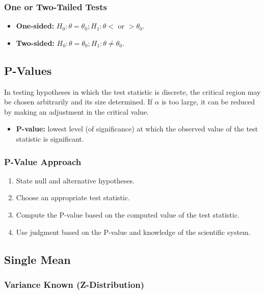 \documentclass[10pt, letterpaper, twoside]{article}
\begin{document}
\begin{multicols}{2}
\subsubsection{One or Two-Tailed Tests}
\begin{itemize}
    \item \textbf{One-sided:} $H_0: \theta = \theta_0; H_1: \theta <$ or $> \theta_0$.
    \item \textbf{Two-sided:} $H_0: \theta = \theta_0; H_1: \theta \neq \theta_0$.
\end{itemize}

\subsection{P-Values}

In testing hypotheses in which the test statistic is discrete, the critical region may be chosen arbitrarily and its size determined. If $\alpha$ is too large, it can be reduced by making an adjustment in the critical value.
\begin{itemize}
    \item \textbf{P-value:} lowest level (of significance) at which the observed value of the test statistic is significant.
\end{itemize}

\subsubsection{P-Value Approach}
\begin{enumerate}
    \item State null and alternative hypotheses.
    \item Choose an appropriate test statistic.
    \item Compute the P-value based on the computed value of the test statistic.
    \item Use judgment based on the P-value and knowledge of the scientific system.
\end{enumerate}

\subsection{Single Mean}

\subsubsection{Variance Known (Z-Distribution)}


\end{multicols}
\end{document}
